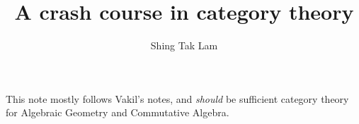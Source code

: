 \documentclass{article}
\title{A crash course in category theory}
\author{Shing Tak Lam}
\begin{document}
\maketitle

This note mostly follows Vakil's notes, and \emph{should} be sufficient category theory for Algebraic Geometry and Commutative Algebra.
\end{document}

